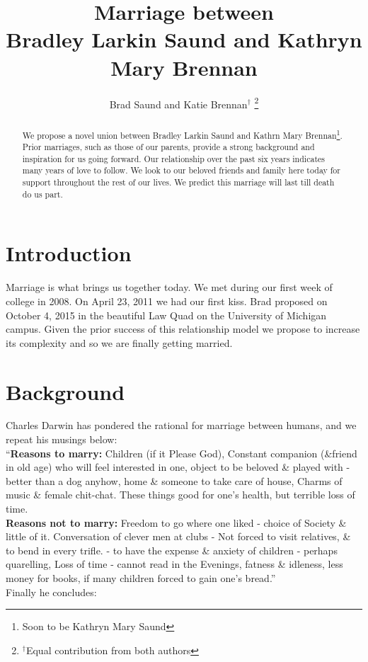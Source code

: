 \documentclass[letterpaper, 11 pt, conference]{ieeeconf}
\title{\LARGE \bf
  Marriage between \\
  Bradley Larkin Saund and Kathryn Mary Brennan
}
\author{Brad Saund and Katie Brennan$^{\dagger}$
\thanks{${^\dagger}$Equal contribution from both authors}%
}
\begin{document}
\maketitle
\thispagestyle{empty}
\pagestyle{empty}


\begin{abstract}
  We propose a novel union between Bradley Larkin Saund and Kathrn Mary Brennan\footnote{Soon to be Kathryn Mary Saund}.
  Prior marriages, such as those of our parents, provide a strong background and inspiration for us going forward.
  Our relationship over the past six years indicates many years of love to follow.
  We look to our beloved friends and family here today for support throughout the rest of our lives.
  We predict this marriage will last till death do us part.
  
\end{abstract}


\section{Introduction}
Marriage is what brings us together today\cite{PrincessBride}.
We met during our first week of college in 2008.
On April 23, 2011 we had our first kiss.
Brad proposed on October 4, 2015 in the beautiful Law Quad on the University of Michigan campus. Given the prior success of this relationship model we propose to increase its complexity and so we are finally getting married\cite{AladdinKoT}.


\section{Background}
Charles Darwin has pondered the rational for marriage between humans, and we repeat his musings below:\\
``\textbf{Reasons to marry:} Children (if it Please God), Constant companion (\&friend in old age) who will feel interested in one, object to be beloved \& played with - better than a dog anyhow, home \& someone to take care of house, Charms of music \& female chit-chat. These things good for one's health, but terrible loss of time.\\
\textbf{Reasons not to marry:} Freedom to go where one liked - choice of Society \& little of it. Conversation of clever men at clubs - Not forced to visit relatives, \& to bend in every trifle. - to have the expense \& anxiety of children - perhaps quarelling, Loss of time - cannot read in the Evenings, fatness \& idleness, less money for books, if many children forced to gain one's bread.''\\
Finally he concludes: 
\end{document}
